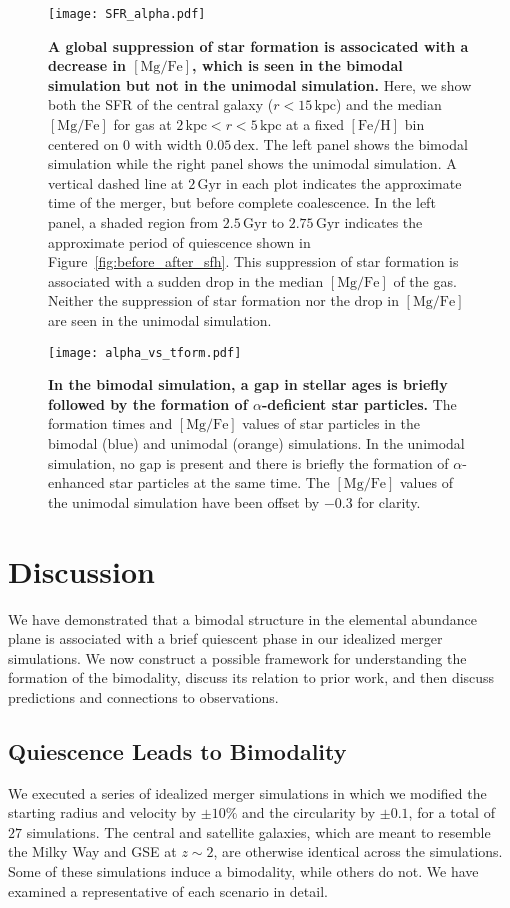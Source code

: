 \documentclass[linenumbers, twocolumn]{aastex631}
\newcommand{\Gyr}{\ensuremath{\textrm{Gyr}}}
\newcommand{\kpc}{\ensuremath{\textrm{kpc}}}
\newcommand{\FeH}{\ensuremath{[\textrm{Fe}/\textrm{H}]}}
\newcommand{\MgFe}{\ensuremath{[\textrm{Mg}/\textrm{Fe}]}}
\newcommand{\dex}{\ensuremath{\textrm{dex}}}
\begin{document}
\begin{figure*}
  \centering
  \texttt{[image: SFR\_alpha.pdf]}
  \caption{\textbf{A global suppression of star formation is associcated with a decrease in \MgFe{}, which is seen in the bimodal simulation but not in the unimodal simulation.} Here, we show both the SFR of the central galaxy ($r<15\,\kpc$) and the median \MgFe{} for gas at $2\,\kpc<r<5\,\kpc$ at a fixed \FeH{} bin centered on $0$ with width $0.05\,\dex$. The left panel shows the bimodal simulation while the right panel shows the unimodal simulation. A vertical dashed line at $2\,\Gyr$ in each plot indicates the approximate time of the merger, but before complete coalescence. In the left panel, a shaded region from $2.5\,\Gyr$ to $2.75\,\Gyr$ indicates the approximate period of quiescence shown in Figure~\ref{fig:before_after_sfh}. This suppression of star formation is associated with a sudden drop in the median \MgFe{} of the gas. Neither the suppression of star formation nor the drop in \MgFe{} are seen in the unimodal simulation.}
  \label{fig:SFR_alpha}
\end{figure*}

\begin{figure}
  \centering
  \texttt{[image: alpha\_vs\_tform.pdf]}
  \caption{\textbf{In the bimodal simulation, a gap in stellar ages is briefly followed by the formation of $\alpha$-deficient star particles.} The formation times and \MgFe{} values of star particles in the bimodal (blue) and unimodal (orange) simulations. In the unimodal simulation, no gap is present and there is briefly the formation of $\alpha$-enhanced star particles at the same time. The \MgFe{} values of the unimodal simulation have been offset by $-0.3$ for clarity.}
  \label{fig:alpha_vs_tform}
\end{figure}

\section{Discussion}\label{sec:discussion}
We have demonstrated that a bimodal structure in the elemental abundance plane is associated with a brief quiescent phase in our idealized merger simulations. We now construct a possible framework for understanding the formation of the bimodality, discuss its relation to prior work, and then discuss predictions and connections to observations.

\subsection{Quiescence Leads to Bimodality}\label{ssec:formqui}
We executed a series of idealized merger simulations in which we modified the starting radius and velocity by $\pm10\%$ and the circularity by $\pm0.1$, for a total of $27$ simulations. The central and satellite galaxies, which are meant to resemble the Milky Way and GSE at $z\sim2$, are otherwise identical across the simulations. Some of these simulations induce a bimodality, while others do not. We have examined a representative of each scenario in detail.
\end{document}
